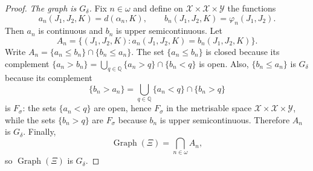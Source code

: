 \documentclass[10pt,a4paper]{amsart}
\DeclareMathOperator{\Graph}{Graph}
\newcommand{\bbQ}{\mathbb{Q}}
\renewcommand{\le}{\leqslant}
\begin{document}
\begin{proof}
\medskip
\emph{The graph is $G_\delta$.}
Fix $n \in \omega$ and define on
$\mathscr{X} \times \mathscr{X} \times \mathscr{Y}$ the functions
\[
    a_n(J_1, J_2, K) = d(\alpha_n, K), \qquad
    b_n(J_1, J_2, K) = \varphi_n(J_1, J_2).
\]
Then $a_n$ is continuous and $b_n$ is upper semicontinuous.  Let
\[
    A_n = \{(J_1, J_2, K) \colon a_n(J_1, J_2, K) = b_n(J_1, J_2, K)\}.
\]
Write $A_n = \{a_n \le b_n\} \cap \{b_n \le a_n\}$.
The set $\{a_n \le b_n\}$ is closed because its complement
$\{a_n > b_n\} = \bigcup_{q \in \bbQ} \{a_n > q\} \cap \{b_n < q\}$ is open.
Also, $\{b_n \le a_n\}$ is $G_\delta$ because its complement
\[
    \{b_n > a_n\}
    = \bigcup_{q \in \bbQ} \{a_n < q\} \cap \{b_n > q\}
\]
is $F_\sigma$: the sets $\{a_n < q\}$ are open, hence $F_\sigma$ in the
metrisable space $\mathscr{X} \times \mathscr{X} \times \mathscr{Y}$, while the
sets $\{b_n > q\}$ are $F_\sigma$ because $b_n$ is upper semicontinuous.
Therefore $A_n$ is $G_\delta$.  Finally,
\[
    \Graph(\Xi) = \bigcap_{n \in \omega} A_n,
\]
so $\Graph(\Xi)$ is $G_\delta$.
\end{proof}
\end{document}
